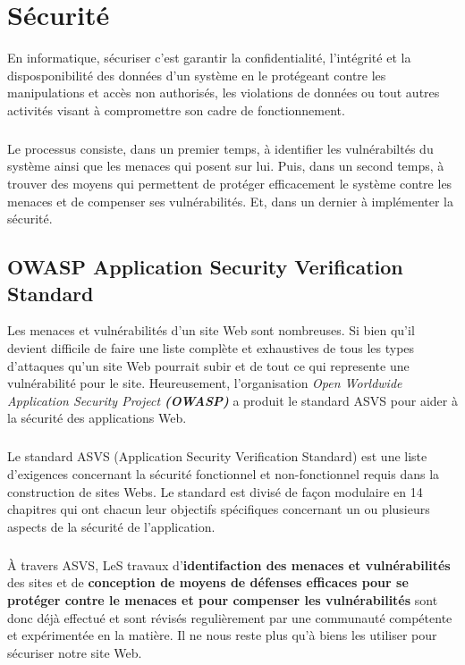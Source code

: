 \chapter{S\'ecurit\'e}

	\label{ChapSecurite}

	En informatique, s\'ecuriser c'est garantir la confidentialit\'e, l'int\'egrit\'e et la disposponibilit\'e des donn\'ees d'un syst\`eme en le prot\'egeant contre les manipulations et acc\`es non authoris\'es, les violations de donn\'ees ou tout autres activit\'es visant \`a compromettre son cadre de fonctionnement.

	\paragraph{} Le processus consiste, dans un premier temps, \`a identifier les vuln\'erabilt\'es du syst\`eme ainsi que les menaces qui posent sur lui. Puis, dans un second temps, \`a trouver des moyens qui permettent de prot\'eger efficacement le syst\`eme contre les menaces et de compenser ses vuln\'erabilit\'es. Et, dans un dernier \`a impl\'ementer la s\'ecurit\'e.

	\section{OWASP Application Security Verification Standard}
		Les menaces et vuln\'erabilit\'es d'un site Web sont nombreuses. Si bien qu'il devient difficile de faire une liste compl\`ete et exhaustives de tous les types d'attaques qu'un site Web pourrait subir et de tout ce qui represente une vuln\'erabilit\'e pour le site. Heureusement, l'organisation {\itshape Open Worldwide Application Security Project \bfseries(OWASP)} a produit le standard ASVS pour aider \`a la s\'ecurit\'e des applications Web.

		\paragraph{} Le standard ASVS (Application Security Verification Standard) est une liste d'exigences concernant la s\'ecurit\'e fonctionnel et non-fonctionnel requis dans la construction de sites Webs. Le standard est divis\'e de fa\c{c}on modulaire en 14 chapitres qui ont chacun leur objectifs sp\'ecifiques concernant un ou plusieurs aspects de la s\'ecurit\'e de l'application.

		\paragraph{} \`A travers ASVS, LeS travaux d'{\bfseries identifaction des menaces et vuln\'erabilit\'es} des sites et de {\bfseries conception de moyens de d\'efenses efficaces pour se prot\'eger contre le menaces et pour compenser les vuln\'erabilit\'es} sont donc d\'ej\`a effectu\'e et sont r\'evis\'es reguli\`erement par une communaut\'e comp\'etente et exp\'eriment\'ee en la mati\`ere. Il ne nous reste plus qu'\`a biens les utiliser pour s\'ecuriser notre site Web.

